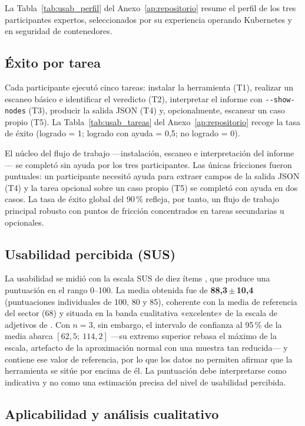 La Tabla~\ref{tab:usab_perfil} del Anexo~\ref{ap:repositorio} resume el perfil de
los tres participantes expertos,
seleccionados por su experiencia operando Kubernetes y en seguridad de
contenedores.

\subsection{Éxito por tarea}

Cada participante ejecutó cinco tareas: instalar la herramienta (T1), realizar un
escaneo básico e identificar el veredicto (T2), interpretar el informe con
\texttt{-{}-show-nodes} (T3), producir la salida \ac{JSON} (T4) y, opcionalmente,
escanear un caso propio (T5). La Tabla~\ref{tab:usab_tareas} del
Anexo~\ref{ap:repositorio} recoge la tasa de
éxito (logrado = 1; logrado con ayuda = 0,5; no logrado = 0).

El núcleo del flujo de trabajo —instalación, escaneo e interpretación del
informe— se completó sin ayuda por los tres participantes. Las únicas fricciones
fueron puntuales: un participante necesitó ayuda para extraer campos de la salida
\ac{JSON} (T4) y la tarea opcional sobre un caso propio (T5) se completó con
ayuda en dos casos. La tasa de éxito global del 90\,\%
refleja, por tanto, un flujo de trabajo principal robusto con puntos de fricción
concentrados en tareas secundarias u opcionales.

\subsection{Usabilidad percibida (SUS)}

La usabilidad se midió con la escala \acs{SUS} de diez ítems
\citep{Brooke1996}, que produce una puntuación en el rango
0--100. La media obtenida fue de \textbf{88,3\,\(\pm\)\,10,4} (puntuaciones
individuales de 100, 80 y 85), coherente con la media de referencia del sector
(68) y situada en la banda cualitativa «excelente» de la escala de adjetivos de
\citet{Bangor2009}. Con \(n=3\), sin embargo, el intervalo de confianza al 95\,\%
de la media abarca \([62{,}5;\ 114{,}2]\) —su extremo superior rebasa el máximo
de la escala, artefacto de la aproximación normal con una muestra tan reducida— y
contiene ese valor de referencia, por
lo que los datos no permiten afirmar que la herramienta se sitúe por encima de
él. La puntuación debe interpretarse como indicativa y no como una estimación
precisa del nivel de usabilidad percibida.

\subsection{Aplicabilidad y análisis cualitativo}

